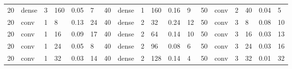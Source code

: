 \begin{table}
{\begin{tabular}{@{}llllll|llllll|llllll@{}}
20                              & dense                          & 3                              & 160                            & 0.05                             & 7                                 & 40                              & dense                          & 1                              & 160                            & 0.16                           & 9                                 & 50                              & conv                           & 2                              & 40                             & 0.04                           & 5                                \\
20                              & conv                           & 1                              & 8                              & 0.13                             & 24                                & 40                              & dense                          & 2                              & 32                             & 0.24                           & 12                                & 50                              & conv                           & 3                              & 8                              & 0.08                           & 10                               \\
20                              & conv                           & 1                              & 16                             & 0.09                             & 17                                & 40                              & dense                          & 2                              & 64                             & 0.14                           & 10                                & 50                              & conv                           & 3                              & 16                             & 0.03                           & 13                               \\
20                              & conv                           & 1                              & 24                             & 0.05                             & 8                                 & 40                              & dense                          & 2                              & 96                             & 0.08                           & 6                                 & 50                              & conv                           & 3                              & 24                             & 0.03                           & 16                               \\
20                              & conv                           & 1                              & 32                             & 0.03                             & 14                                & 40                              & dense                          & 2                              & 128                            & 0.14                           & 4                                 & 50                              & conv                           & 3                              & 32                             & 0.01                           & 32                               \\

\end{tabular}}
\end{table}
